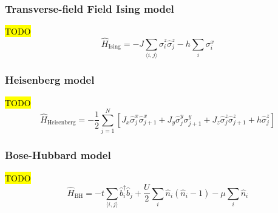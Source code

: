 \subsubsection{Transverse-field Field Ising model}
\hl{TODO}
\begin{equation}
	\label{eq:ising_hamiltonian}
	\hat H_{\mathrm{Ising}}=-J \sum_{\langle i, j\rangle} \hat{\sigma}^z_{i} \hat{\sigma}^z_{j}-h \sum_{i} \sigma^x_{i}
\end{equation}
\subsubsection{Heisenberg model}
\hl{TODO}
\begin{equation}
	\label{eq:heisenberg_hamiltonian}
	\hat{H}_{\mathrm{Heisenberg}}=-\frac{1}{2} \sum_{j=1}^{N}
	\left[J_{x} \hat{\sigma}_{j}^{x} \hat{\sigma}_{j+1}^{x}+J_{y} \hat{\sigma}_{j}^{y} \sigma_{j+1}^{y}+J_{z} \hat{\sigma}_{j}^{z} \hat{\sigma}_{j+1}^{z}+h \hat{\sigma}_{j}^{z}
	\right]
\end{equation}
\subsubsection{Bose-Hubbard model}
\hl{TODO}
\begin{equation}
	\label{eq:bh_hamiltonian}
	\hat{H}_{\mathrm{BH}}= -t \sum_{\langle i, j\rangle} \hat{b}_{i}^{\dagger} \hat{b}_{j}+\frac{U}{2} \sum_{i} \hat{n}_{i}\left(\hat{n}_{i}-1\right)-\mu \sum_{i} \hat{n}_{i}
\end{equation}

\newpage
